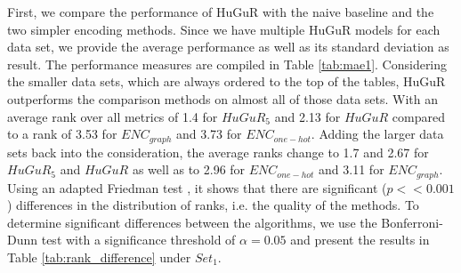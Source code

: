 First, we compare the performance of HuGuR with the naive baseline and the two simpler encoding methods. Since we have multiple HuGuR models for each data set, we provide the average performance as well as its standard deviation as result. The performance measures are compiled in Table \ref{tab:mae1}. Considering the smaller data sets, which are always ordered to the top of the tables, HuGuR outperforms the comparison methods on almost all of those data sets. With an average rank over all metrics of 1.4 for $HuGuR_5$ and 2.13 for $HuGuR$ compared to a rank of 3.53 for $ENC_{graph}$ and 3.73 for $ENC_{one-hot}$. Adding the larger data sets back into the consideration, the average ranks change to 1.7 and 2.67 for $HuGuR_5$ and $HuGuR$ as well as to 2.96 for $ENC_{one-hot}$ and 3.11 for $ENC_{graph}$. Using an adapted Friedman test \cite{ranking:signific}, it shows that there are significant ($p << 0.001$) differences in the distribution of ranks, i.e. the quality of the methods. To determine significant differences between the algorithms, we use the Bonferroni-Dunn test \cite{ranking:signific} with a significance threshold of $\alpha = 0.05$ and present the results in Table \ref{tab:rank_difference} under $Set_1$.



